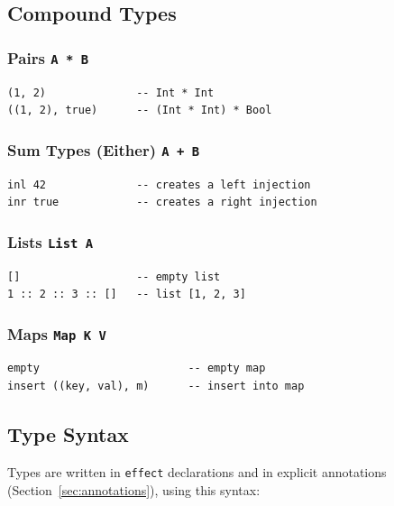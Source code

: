\documentclass[11pt,a4paper]{article}
\newcommand{\cba}[1]{\lstinline[style=cbainline]{#1}}
\begin{document}
\subsection{Compound Types}

\subsubsection*{Pairs \texttt{A * B}}

\begin{lstlisting}
(1, 2)              -- Int * Int
((1, 2), true)      -- (Int * Int) * Bool
\end{lstlisting}

\subsubsection*{Sum Types (Either) \texttt{A + B}}

\begin{lstlisting}
inl 42              -- creates a left injection
inr true            -- creates a right injection
\end{lstlisting}

\subsubsection*{Lists \texttt{List A}}

\begin{lstlisting}
[]                  -- empty list
1 :: 2 :: 3 :: []   -- list [1, 2, 3]
\end{lstlisting}

\subsubsection*{Maps \texttt{Map K V}}

\begin{lstlisting}
empty                       -- empty map
insert ((key, val), m)      -- insert into map
\end{lstlisting}

\subsection{Type Syntax}

Types are written in \cba{effect} declarations and in explicit annotations
(Section~\ref{sec:annotations}), using this syntax:
\end{document}

